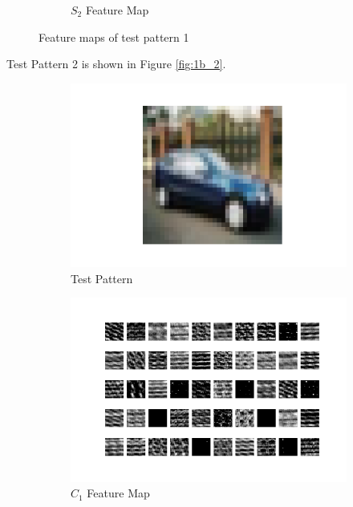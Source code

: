 \begin{figure}[H]
\begin{subfigure}{0.5\textwidth}
        \caption{$\textit{S}_2$ Feature Map}
    \end{subfigure}
    \caption{Feature maps of test pattern 1}
    \label{fig:1b_1}
\end{figure}

Test Pattern 2 is shown in Figure \ref{fig:1b_2}.
\begin{figure}[H]
    \begin{subfigure}{0.5\textwidth}
        \centering
        \includegraphics[width=1\linewidth]{assets/plots1/q1a_test_pattern_1.png}
        \caption{Test Pattern}
    \end{subfigure}
    \begin{subfigure}{0.5\textwidth}
        \centering
        \includegraphics[width=1\linewidth]{assets/plots1/q1a_conv1_1.png}
        \caption{$\textit{C}_1$ Feature Map}
    \end{subfigure}
    \begin{subfigure}{0.5\textwidth}

\end{subfigure}
\end{figure}
